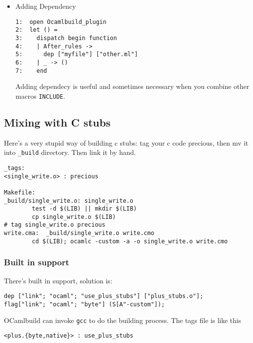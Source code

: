 \documentclass[11pt]{article}
\begin{document}
\begin{itemize}
\begin{itemize}
\item Adding Dependency\\
\label{sec-1-12-2-2-4}%
\begin{verbatim}
1:  open Ocamlbuild_plugin
2:  let () =
3:    dispatch begin function
4:    | After_rules ->
5:      dep ["myfile"] ["other.ml"]
6:    | _ -> ()
7:    end
\end{verbatim}

      

      Adding dependecy is useful and sometimes necessary when you
      combine other macros \texttt{INCLUDE}.

\end{itemize} %
\end{itemize} %
\subsection*{Mixing with C stubs}
\label{sec-1-13}


   Here's a very stupid way of building c stubs: tag your c code
   precious, then mv it into \texttt{\_build} directory. Then link it by hand.



\begin{verbatim}
_tags:
<single_write.o> : precious

Makefile:
_build/single_write.o: single_write.o
        test -d $(LIB) || mkdir $(LIB)
        cp single_write.o $(LIB)
# tag single_write.o precious
write.cma:  _build/single_write.o write.cmo
        cd $(LIB); ocamlc -custom -a -o single_write.o write.cmo
\end{verbatim}
\subsubsection*{Built in support}
\label{sec-1-13-1}

    There's built in support, solution is:



\begin{verbatim}
dep ["link"; "ocaml"; "use_plus_stubs"] ["plus_stubs.o"];
flag["link"; "ocaml"; "byte"] (S[A"-custom"]);
\end{verbatim}

    OCamlbuild can invoke \texttt{gcc} to do the building process. The tags file is
    like this



\begin{verbatim}
<plus.{byte,native}> : use_plus_stubs
\end{verbatim}
\end{document}
